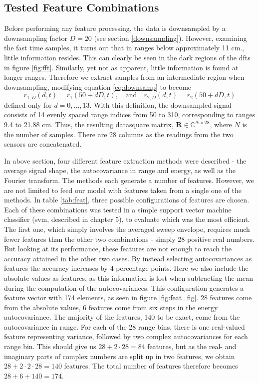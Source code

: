 \subsection{Tested Feature Combinations}
Before performing any feature processing, the data is downsampled by a downsampling factor $D=20$ (see section \ref{downsampling}). However, examining the fast time samples, it turns out that in ranges below approximately 11 cm., little information resides. This can clearly be seen in the dark regions of the \gls{dft}s in figure \ref{fig:fft}. Similarly, yet not as apparent, little information is found at longer ranges. Therefore we extract samples from an intermediate region when downsampling, modifying equation \eqref{eq:downsamp} to become
\begin{equation}
	r_{1,D}(d, t) = r_{1}(50+dD,t), 
	\quad \text{and} \quad r_{2,D}(d,t) = r_{2}(50+dD,t)
\end{equation}
defined only for $d=0,...,13$. With this definition, the downsampled signal consists of 14 evenly spaced range indices from 50 to 310, corresponding to ranges 9.4 to 21.88 cm. Thus, the resulting datasquare matrix, $\mathbf{R}\in \mathbb{C}^{N\times 28}$, where $N$ is the number of samples. There are 28 columns as the readings from the two sensors are concatenated. 

In above section, four different feature extraction methods were described - the average signal shape, the autocovariance in range and energy, as well as the Fourier transform. The methods each generate a number of features. However, we are not limited to feed our model with features taken from a single one of the methods. In table \ref{tab:feat}, three possible configurations of features are chosen. Each of these combinations was tested in a simple support vector machine classifier (\gls{svm}, described in chapter 5), to evaluate which was the most efficient. The first one, which simply involves the averaged sweep envelope, requires much fewer features than the other two combinations - simply 28 positive real numbers. But looking at its performance, these features are not enough to reach the accuracy attained in the other two cases. By instead selecting autocovariances as features the accuracy increases by 4 percentage points. Here we also include the absolute values as features, as this information is lost when subtracting the mean during the computation of the autocovariances. This configuration generates a feature vector with 174 elements, as seen in figure \ref{fig:feat_fig}. 28 features come from the absolute values, 6 features come from six steps in the energy autocovariance. The majority of the features, 140 to be exact, come from the autocovariance in range. For each of the 28 range bins, there is one real-valued feature representing variance, followed by two complex autocovariances for each range bin. This should give us $28+2\cdot 28=84$ features, but as the real- and imaginary parts of complex numbers are split up in two features, we obtain $28+2\cdot2\cdot 28=140$ features. The total number of features therefore becomes $28+6+140=174$.

